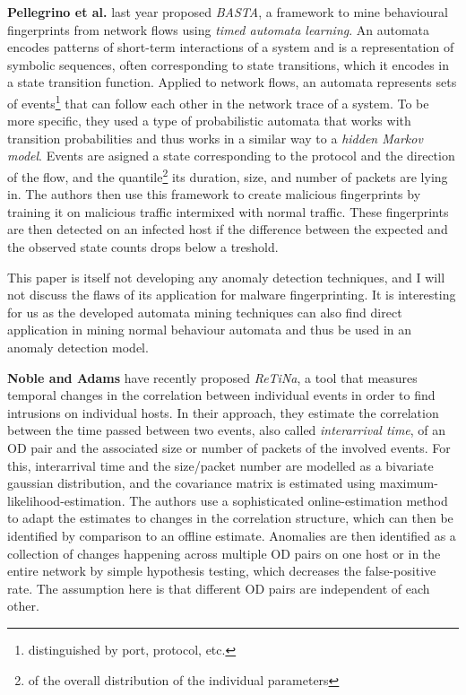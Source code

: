 \textbf{Pellegrino et al.} \cite{pellegrino2017learning} last year proposed \textit{BASTA}, a framework to mine behavioural fingerprints from network flows using \textit{timed automata learning}. An automata encodes patterns of short-term interactions of a system and is a representation of symbolic sequences, often corresponding to state transitions, which it encodes in a state transition function. Applied to network flows, an automata represents sets of events\footnote{distinguished by port,  protocol, etc.} that can follow each other in the network trace of a system. To be more specific, they used a type of probabilistic automata that works with transition probabilities and thus works in a similar way to a \textit{hidden Markov model}. Events are asigned a state corresponding to the protocol and the direction of the flow, and the quantile\footnote{of the overall distribution of the individual parameters} its duration, size, and number of packets are lying in. The authors then use this framework to create malicious fingerprints by training it on malicious traffic intermixed with normal traffic. These fingerprints are then detected on an infected host if the difference between the expected and the observed state counts drops below a treshold. 

This paper is itself not developing any anomaly detection techniques, and I will not discuss the flaws of its application for malware fingerprinting. It is interesting for us as the developed automata mining techniques can also find direct application in mining normal behaviour automata and thus be used in an anomaly detection model. 


\textbf{Noble and Adams} \cite{noble_real-time_2018, noble_correlation-based_2016} have recently proposed \textit{ReTiNa}, a tool that measures temporal changes in the correlation between individual events in order to find intrusions on individual hosts. In their approach, they estimate the correlation between the time passed between two events, also called \textit{interarrival time}, of an OD pair and the associated size or number of packets of the involved events. For this, interarrival time and the size/packet number are modelled as a bivariate gaussian distribution, and the covariance matrix is estimated using maximum-likelihood-estimation. The authors use a sophisticated online-estimation method to adapt the estimates to changes in the correlation structure, which can then be identified by comparison to an offline estimate. Anomalies are then identified as a collection of changes happening across multiple OD pairs on one host or in the entire network by simple hypothesis testing, which decreases the false-positive rate. The assumption here is that different OD pairs are independent of each other.


